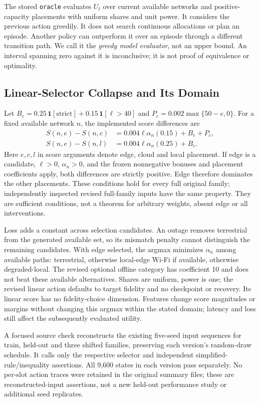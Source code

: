 \documentclass[10pt,twocolumn]{article}
\newcommand{\pol}[1]{\texttt{#1}}
\begin{document}
The stored \pol{oracle} evaluates $U_t$ over current available networks and positive-capacity placements with uniform shares and unit power. It considers the previous action greedily. It does not search continuous allocations or plan an episode. Another policy can outperform it over an episode through a different transition path. We call it the \emph{greedy model evaluator}, not an upper bound. An interval spanning zero against it is inconclusive; it is not proof of equivalence or optimality.


\subsection{Linear-Selector Collapse and Its Domain}
\label{sec:selector}
Let $B_e=0.25\,\mathbf{1}[\mathrm{strict}]+0.15\,\mathbf{1}[\ell>40]$ and $P_c=0.002\max\{50-e,0\}$. For a fixed available network $n$, the implemented score differences are
\begin{align}
 S(n,e)-S(n,c)&=0.004\ell\alpha_n(0.15)+B_e+P_c,\label{eq:edgecloud}\\
 S(n,e)-S(n,l)&=0.004\ell\alpha_n(0.25)+B_e.\label{eq:edgelocal}
\end{align}
Here $e,c,l$ in score arguments denote edge, cloud and local placement. If edge is a candidate, $\ell>0$, $\alpha_n>0$, and the frozen nonnegative bonuses and placement coefficients apply, both differences are strictly positive. Edge therefore dominates the other placements. These conditions hold for every full original family; independently inspected revised full-family inputs have the same property. They are sufficient conditions, not a theorem for arbitrary weights, absent edge or all interventions.

Loss adds a constant across selection candidates. An outage removes terrestrial from the generated available set, so its mismatch penalty cannot distinguish the remaining candidates. With edge selected, the argmax minimizes $\alpha_n$ among available paths: terrestrial, otherwise local-edge Wi-Fi if available, otherwise degraded-local. The revised optional offline category has coefficient 10 and does not beat these available alternatives. Shares are uniform, power is one; the revised linear action defaults to target fidelity and no checkpoint or recovery. Its linear score has no fidelity-choice dimension. Features change score magnitudes or margins without changing this argmax within the stated domain; latency and loss still affect the subsequently evaluated utility.

A focused source check reconstructs the existing five-seed input sequences for train, held-out and three shifted families, preserving each version's random-draw schedule. It calls only the respective selector and independent simplified-rule/inequality assertions. All 9,600 states in each version pass separately. No per-slot action traces were retained in the original summary files; these are reconstructed-input assertions, not a new held-out performance study or additional seed replicates.
\end{document}
